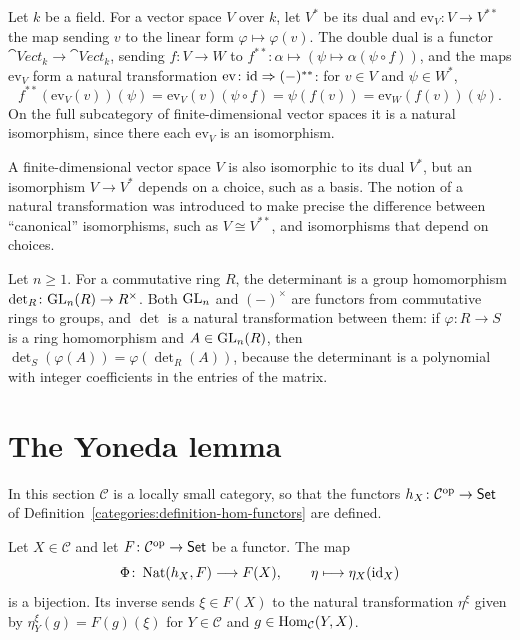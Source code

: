\begin{example}\label{categories:example-double-dual}
Let $k$ be a field. For a vector space $V$ over $k$, let $V^*$ be its dual and
$\mathrm{ev}_V \colon V \to V^{**}$ the map sending $v$ to the linear form
$\varphi \mapsto \varphi(v)$. The double dual is a functor
$\cat{Vect}_k \to \cat{Vect}_k$, sending $f \colon V \to W$ to
$f^{**} \colon \alpha \mapsto (\psi \mapsto \alpha(\psi \circ f))$, and the maps
$\mathrm{ev}_V$ form a natural transformation
$\mathrm{ev} \colon \mathrm{id} \Rightarrow (-)^{**}$: for $v \in V$ and
$\psi \in W^*$,
\[
f^{**}(\mathrm{ev}_V(v))(\psi) = \mathrm{ev}_V(v)(\psi \circ f) = \psi(f(v))
= \mathrm{ev}_W(f(v))(\psi).
\]
On the full subcategory of finite-dimensional vector spaces it is a natural
isomorphism, since there each $\mathrm{ev}_V$ is an isomorphism.
\end{example}

\begin{remark}\label{categories:remark-not-natural}
A finite-dimensional vector space $V$ is also isomorphic to its dual $V^*$,
but an isomorphism $V \to V^*$ depends on a choice, such as a basis. The
notion of a natural transformation was introduced to make precise the
difference between ``canonical'' isomorphisms, such as
$V \cong V^{**}$, and isomorphisms that depend on choices.
\end{remark}

\begin{example}\label{categories:example-determinant}
Let $n \geq 1$. For a commutative ring $R$, the determinant is a group
homomorphism $\det_R \colon \mathrm{GL}_n(R) \to R^\times$. Both $\mathrm{GL}_n$ and
$(-)^\times$ are functors from commutative rings to groups, and $\det$ is a
natural transformation between them: if $\varphi \colon R \to S$ is a ring
homomorphism and $A \in \mathrm{GL}_n(R)$, then $\det_S(\varphi(A)) = \varphi(\det_R(A))$,
because the determinant is a polynomial with integer coefficients in the
entries of the matrix.
\end{example}

\section{The Yoneda lemma}\label{categories:section-yoneda}

In this section $\mathcal{C}$ is a locally small category, so that the functors
$h_X \colon \mathcal{C}^{\mathrm{op}} \to \mathsf{Set}$ of
Definition~\ref{categories:definition-hom-functors} are defined.

\begin{theorem}\label{categories:theorem-yoneda}
Let $X \in \mathcal{C}$ and let $F \colon \mathcal{C}^{\mathrm{op}} \to \mathsf{Set}$ be a
functor. The map
\[
\Phi \colon \operatorname{Nat}(h_X, F) \longrightarrow F(X), \qquad
\eta \longmapsto \eta_X(\mathrm{id}_X)
\]
is a bijection. Its inverse sends $\xi \in F(X)$ to the natural transformation
$\eta^\xi$ given by $\eta^\xi_Y(g) = F(g)(\xi)$ for $Y \in \mathcal{C}$ and
$g \in \operatorname{Hom}_{\mathcal{C}}(Y, X)$.
\end{theorem}

